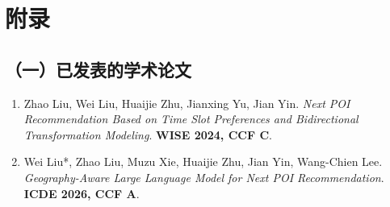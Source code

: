 \chapter*{附录}

\section*{（一）已发表的学术论文}

\begin{enumerate}
    \item Zhao Liu, Wei Liu, Huaijie Zhu, Jianxing Yu, Jian Yin. \textit{Next POI Recommendation Based on Time Slot Preferences and Bidirectional Transformation Modeling}. \textbf{WISE 2024, CCF C}.

    \item Wei Liu*, Zhao Liu, Muzu Xie, Huaijie Zhu, Jian Yin, Wang-Chien Lee. \textit{Geography-Aware Large Language Model for Next POI Recommendation}. \textbf{ICDE 2026, CCF A}.
\end{enumerate}

\pagestyle{thesisnormal}
